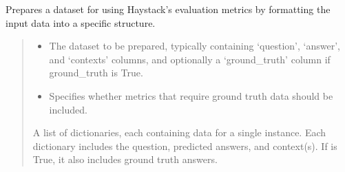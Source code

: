 \documentclass[letterpaper,10pt,english,openany,oneside]{sphinxmanual}
\begin{document}

\begin{fulllineitems}
\label{\detokenize{evaluation:tools.pipeline.haystack_prepare_data}}
\pysigstartsignatures
{}
\pysigstopsignatures
\sphinxAtStartPar
Prepares a dataset for using Haystack’s evaluation metrics by formatting the input data into a
specific structure.
\begin{quote}\begin{description}
\begin{itemize}
\item {} 
\sphinxAtStartPar
{} \textendash{} The dataset to be prepared, typically containing ‘question’, ‘answer’, and ‘contexts’ columns,
and optionally a ‘ground\_truth’ column if ground\_truth is True.

\item {} 
\sphinxAtStartPar
{} \textendash{} Specifies whether metrics that require ground truth data should be included.

\end{itemize}

\sphinxAtStartPar
A list of dictionaries, each containing data for a single instance. Each dictionary includes
the question, predicted answers, and context(s). If  is True, it also includes
ground truth answers.

\end{description}\end{quote}

\end{fulllineitems}

\end{document}
